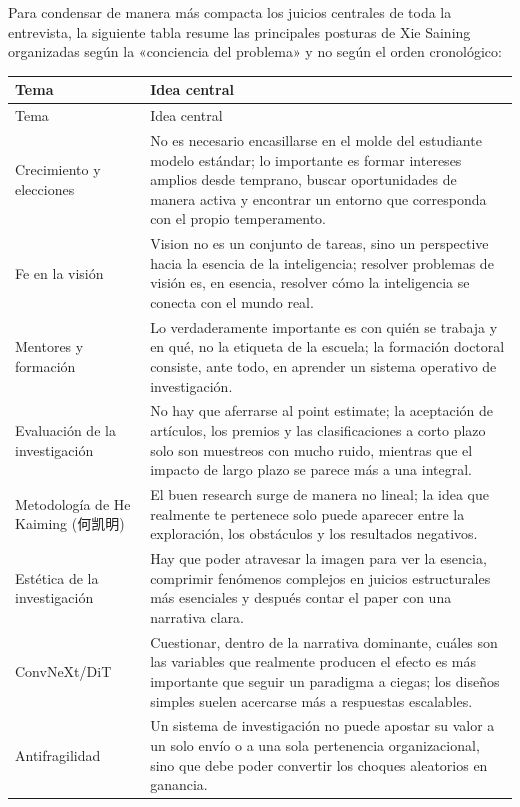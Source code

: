 Para condensar de manera más compacta los juicios centrales de toda la entrevista, la siguiente tabla resume las principales posturas de Xie Saining organizadas según la «conciencia del problema» y no según el orden cronológico:

\begin{longtable}{>{\raggedright\arraybackslash}p{} >{\raggedright\arraybackslash}p{}}
\toprule
Tema & Idea central \\
\midrule
\endfirsthead
\toprule
Tema & Idea central \\
\midrule
\endhead
Crecimiento y elecciones & No es necesario encasillarse en el molde del estudiante modelo estándar; lo importante es formar intereses amplios desde temprano, buscar oportunidades de manera activa y encontrar un entorno que corresponda con el propio temperamento. \\
Fe en la visión & Vision no es un conjunto de tareas, sino un perspective hacia la esencia de la inteligencia; resolver problemas de visión es, en esencia, resolver cómo la inteligencia se conecta con el mundo real. \\
Mentores y formación & Lo verdaderamente importante es con quién se trabaja y en qué, no la etiqueta de la escuela; la formación doctoral consiste, ante todo, en aprender un sistema operativo de investigación. \\
Evaluación de la investigación & No hay que aferrarse al point estimate; la aceptación de artículos, los premios y las clasificaciones a corto plazo solo son muestreos con mucho ruido, mientras que el impacto de largo plazo se parece más a una integral. \\
Metodología de He Kaiming (何凯明) & El buen research surge de manera no lineal; la idea que realmente te pertenece solo puede aparecer entre la exploración, los obstáculos y los resultados negativos. \\
Estética de la investigación & Hay que poder atravesar la imagen para ver la esencia, comprimir fenómenos complejos en juicios estructurales más esenciales y después contar el paper con una narrativa clara. \\
ConvNeXt/DiT & Cuestionar, dentro de la narrativa dominante, cuáles son las variables que realmente producen el efecto es más importante que seguir un paradigma a ciegas; los diseños simples suelen acercarse más a respuestas escalables. \\
Antifragilidad & Un sistema de investigación no puede apostar su valor a un solo envío o a una sola pertenencia organizacional, sino que debe poder convertir los choques aleatorios en ganancia. \\

\end{longtable}
